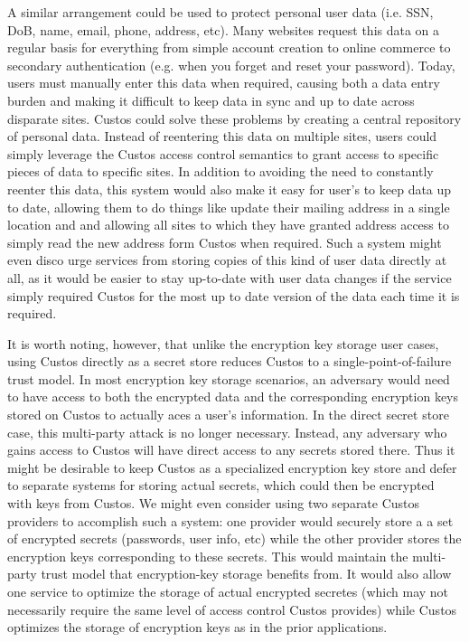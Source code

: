 A similar arrangement could be used to protect personal user data
(i.e. SSN, DoB, name, email, phone, address, etc). Many websites
request this data on a regular basis for everything from simple
account creation to online commerce to secondary authentication
(e.g. when you forget and reset your password). Today, users must
manually enter this data when required, causing both a data entry
burden and making it difficult to keep data in sync and up to date
across disparate sites. Custos could solve these problems by creating
a central repository of personal data. Instead of reentering this data
on multiple sites, users could simply leverage the Custos access
control semantics to grant access to specific pieces of data to
specific sites. In addition to avoiding the need to constantly reenter
this data, this system would also make it easy for user's to keep data
up to date, allowing them to do things like update their mailing
address in a single location and and allowing all sites to which they
have granted address access to simply read the new address form Custos
when required. Such a system might even disco urge services from
storing copies of this kind of user data directly at all, as it would
be easier to stay up-to-date with user data changes if the service
simply required Custos for the most up to date version of the data
each time it is required.

It is worth noting, however, that unlike the encryption key storage
user cases, using Custos directly as a secret store reduces Custos to
a single-point-of-failure trust model. In most encryption key storage
scenarios, an adversary would need to have access to both the
encrypted data and the corresponding encryption keys stored on Custos
to actually aces a user's information. In the direct secret store
case, this multi-party attack is no longer necessary. Instead, any
adversary who gains access to Custos will have direct access to any
secrets stored there. Thus it might be desirable to keep Custos as a
specialized encryption key store and defer to separate systems for
storing actual secrets, which could then be encrypted with keys from
Custos. We might even consider using two separate Custos providers to
accomplish such a system: one provider would securely store a a set of
encrypted secrets (passwords, user info, etc) while the other provider
stores the encryption keys corresponding to these secrets. This would
maintain the multi-party trust model that encryption-key storage
benefits from. It would also allow one service to optimize the storage
of actual encrypted secretes (which may not necessarily require the
same level of access control Custos provides) while Custos optimizes
the storage of encryption keys as in the prior applications.

